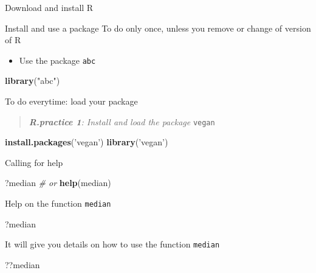 \documentclass[
  ignorenonframetext,
]{beamer}
\newenvironment{Shaded}{\begin{snugshade}}{\end{snugshade}}
\newcommand{\CommentTok}[1]{\textcolor[rgb]{0.56,0.35,0.01}{\textit{#1}}}
\newcommand{\KeywordTok}[1]{\textcolor[rgb]{0.13,0.29,0.53}{\textbf{#1}}}
\newcommand{\NormalTok}[1]{#1}
\newcommand{\StringTok}[1]{\textcolor[rgb]{0.31,0.60,0.02}{#1}}
\providecommand{\tightlist}{%
  \setlength{\itemsep}{0pt}\setlength{\parskip}{0pt}}
\begin{document}
\begin{frame}[fragile]{Download and install R}
\begin{block}{Install and use a package}
To do only once, unless you remove or change of version of R

\begin{itemize}
\tightlist
\item
  Use the package {\texttt{abc}}
\end{itemize}

\begin{Shaded}
\begin{Highlighting}[]
\KeywordTok{library}\NormalTok{(}\StringTok{"abc"}\NormalTok{)}
\end{Highlighting}
\end{Shaded}

To do everytime: load your package

\begin{quote}
\emph{{\textbf{R.practice 1}: Install and load the package }}
{\texttt{vegan}}
\end{quote}

\begin{Shaded}
\begin{Highlighting}[]
\KeywordTok{install.packages}\NormalTok{(}\StringTok{'vegan'}\NormalTok{)}
\KeywordTok{library}\NormalTok{(}\StringTok{'vegan'}\NormalTok{)}
\end{Highlighting}
\end{Shaded}

\HELP

\end{block}

\begin{block}{Calling for help}

\begin{Shaded}
\begin{Highlighting}[]
\NormalTok{?median}
\CommentTok{# or}
\KeywordTok{help}\NormalTok{(median)}
\end{Highlighting}
\end{Shaded}

Help on the function {\texttt{median}}

\begin{Shaded}
\begin{Highlighting}[]
\NormalTok{?median}
\end{Highlighting}
\end{Shaded}

It will give you details on how to use the function {\texttt{median}}

\begin{Shaded}
\begin{Highlighting}[]
\NormalTok{??median}
\end{Highlighting}
\end{Shaded}


\end{block}
\end{frame}
\end{document}
